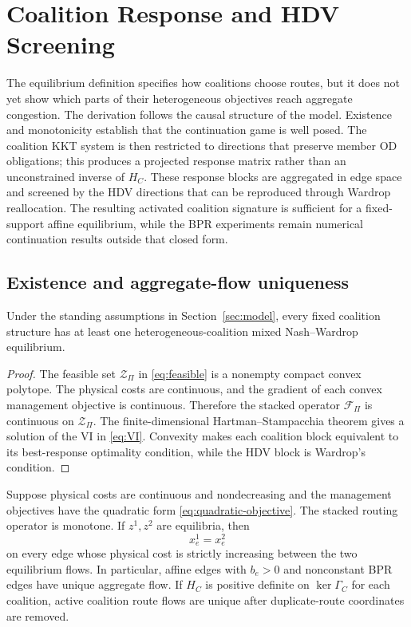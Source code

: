 \section{Coalition Response and HDV Screening}\label{sec:response}

The equilibrium definition specifies how coalitions choose routes, but it does not yet show which parts of their heterogeneous objectives reach aggregate congestion. The derivation follows the causal structure of the model. Existence and monotonicity establish that the continuation game is well posed. The coalition KKT system is then restricted to directions that preserve member OD obligations; this produces a projected response matrix rather than an unconstrained inverse of $H_C$. These response blocks are aggregated in edge space and screened by the HDV directions that can be reproduced through Wardrop reallocation. The resulting activated coalition signature is sufficient for a fixed-support affine equilibrium, while the BPR experiments remain numerical continuation results outside that closed form.

\subsection{Existence and aggregate-flow uniqueness}\label{sec:response_wellposed}

\begin{proposition}[Existence]\label{prop:wellposed}
Under the standing assumptions in Section~\ref{sec:model}, every fixed coalition structure has at least one heterogeneous-coalition mixed Nash--Wardrop equilibrium.
\end{proposition}

\begin{proof}
The feasible set $\mathcal Z_\Pi$ in \eqref{eq:feasible} is a nonempty compact convex polytope. The physical costs are continuous, and the gradient of each convex management objective is continuous. Therefore the stacked operator $\mathcal F_\Pi$ is continuous on $\mathcal Z_\Pi$. The finite-dimensional Hartman--Stampacchia theorem gives a solution of the VI in \eqref{eq:VI}. Convexity makes each coalition block equivalent to its best-response optimality condition, while the HDV block is Wardrop's condition.
\end{proof}

\begin{proposition}\label{prop:coalition-monotone}
Suppose physical costs are continuous and nondecreasing and the management objectives have the quadratic form \eqref{eq:quadratic-objective}. The stacked routing operator is monotone. If $z^1,z^2$ are equilibria, then
\[
 x_e^1=x_e^2
\]
on every edge whose physical cost is strictly increasing between the two equilibrium flows. In particular, affine edges with $b_e>0$ and nonconstant BPR edges have unique aggregate flow. If $H_C$ is positive definite on $\ker\Gamma_C$ for each coalition, active coalition route flows are unique after duplicate-route coordinates are removed.
\end{proposition}

